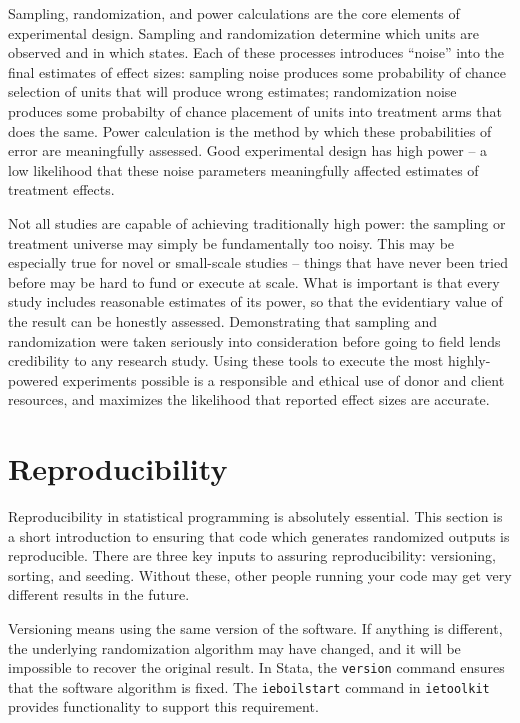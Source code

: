 
\begin{fullwidth}
Sampling, randomization, and power calculations are the core elements of experimental design.
Sampling and randomization determine which units are observed and in which states.
Each of these processes introduces ``noise'' into the final estimates of effect sizes:
sampling noise produces some probability of chance selection of units that will produce wrong estimates;
randomization noise produces some probabilty of chance placement of units into treatment arms that does the same.
Power calculation is the method by which these probabilities of error are meaningfully assessed.
Good experimental design has high power -- a low likelihood that these noise parameters meaningfully affected estimates of treatment effects.

Not all studies are capable of achieving traditionally high power:
the sampling or treatment universe may simply be fundamentally too noisy.
This may be especially true for novel or small-scale studies --
things that have never been tried before may be hard to fund or execute at scale.
What is important is that every study includes reasonable estimates of its power,
so that the evidentiary value of the result can be honestly assessed.
Demonstrating that sampling and randomization were taken seriously into consideration
before going to field lends credibility to any research study.
Using these tools to execute the most highly-powered experiments possible
is a responsible and ethical use of donor and client resources,
and maximizes the likelihood that reported effect sizes are accurate.
\end{fullwidth}

\section{Reproducibility}

Reproducibility in statistical programming is absolutely essential.
This section is a short introduction to ensuring that code
which generates randomized outputs is reproducible.
There are three key inputs to assuring reproducibility:
versioning, sorting, and seeding.
Without these, other people running your code may get very different results in the future.

Versioning means using the same version of the software.
If anything is different, the underlying randomization algorithm may have changed,
and it will be impossible to recover the original result.
In Stata, the \texttt{version} command ensures that the software algorithm is fixed.
The \texttt{ieboilstart} command in \texttt{ietoolkit} provides functionality to support this requirement.

